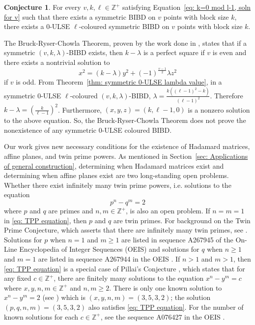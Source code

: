 \documentclass[12pt]{article}
\theoremstyle{definition}
\newtheorem{conjecture}[theorem]{Conjecture}
\begin{document}
\begin{conjecture}\label{conj: existence of 0-ULSE sym BIBDs}
    For every $v,k,\ell \in \mathbb{Z}^+$ satisfying Equation~\eqref{eq: k=0 mod l-1, soln for v} such that there exists a symmetric BIBD on $v$ points with block size $k$, there exists a $0$-ULSE $\ell$-coloured symmetric BIBD on $v$ points with block size $k$.
\end{conjecture}

The Bruck-Ryser-Chowla Theorem, proven by the work done in \cite{BR49, CR50, S49}, states that if a symmetric $(v,k,\lambda)$-BIBD exists, then $k-\lambda$ is a perfect square if $v$ is even and there exists a nontrivial solution to \[x^2 = (k-\lambda)y^2 + (-1)^{\frac{v-1}{2}}\lambda z^2\] if $v$ is odd. From Theorem~\ref{thm: symmetric 0-ULSE lambda value}, in a symmetric $0$-ULSE $\ell$-coloured $(v,k,\lambda)$-BIBD, $\lambda = \frac{k((\ell-1)^2 - k)}{(\ell-1)^2}$. Therefore $k-\lambda = \left(\frac{k}{\ell-1}\right)^2$. Furthermore, $(x,y,z) = (k, \ell-1, 0)$ is a nonzero solution to the above equation. So, the Bruck-Ryser-Chowla Theorem does not prove the nonexistence of any symmetric $0$-ULSE coloured BIBD.

Our work gives new necessary conditions for the existence of Hadamard matrices, affine planes, and twin prime powers. As mentioned in Section~\ref{sec: Applications of general construction}, determining when Hadamard matrices exist and determining when affine planes exist are two long-standing open problems. Whether there exist infinitely many twin prime powers, i.e. solutions to the equation
\begin{equation}\label{eq: TPP equation}
    p^n - q^m = 2
\end{equation}
where $p$ and $q$ are primes and $n,m\in \mathbb{Z}^+$, is also an open problem. If $n=m=1$ in \eqref{eq: TPP equation}, then $p$ and $q$ are twin primes. For background on the Twin Prime Conjecture, which asserts that there are infinitely many twin primes, see \cite{M19}. Solutions for $p$ when $n = 1$ and $m\geq 1$ are listed in sequence A267945 of the On-Line Encyclopedia of Integer Sequences (OEIS) \cite{OEISc} and solutions for $q$ when $n \geq 1$ and $m=1$ are listed in sequence A267944 in the OEIS \cite{OEISb}. If $n>1$ and $m>1$, then \eqref{eq: TPP equation} is a special case of Pillai's Conjecture \cite{P36, P37}, which states that for any fixed $c \in \mathbb{Z}^+$, there are finitely many solutions to the equation $x^n - y^m = c$ where $x,y,n,m\in \mathbb{Z}^+$ and $n,m \geq 2$. There is only one known solution to $x^n - y^m = 2$ (see \cite{OEISa}) which is $(x,y,n,m) = (3,5,3,2)$; the solution $(p,q,n,m) = (3,5,3,2)$ also satisfies \eqref{eq: TPP equation}. For the number of known solutions for each $c\in \mathbb{Z}^+$, see the sequence A076427 in the OEIS \cite{OEISa}.
\end{document}
